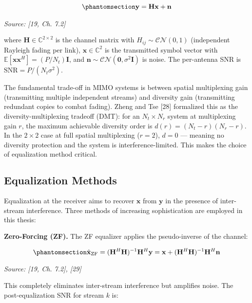 \begin{equation}\protect\phantomsection\label{eq:mimo-received}{\mathbf{y} = \mathbf{H}\mathbf{x} + \mathbf{n}
}\end{equation} \par{\small\textit{Source: [19, Ch. 7.2]}}

where \(\mathbf{H} \in \mathbb{C}^{2 \times 2}\) is the channel matrix with \(H_{ij} \sim \mathcal{CN}(0, 1)\) (independent Rayleigh fading per link), \(\mathbf{x} \in \mathbb{C}^{2}\) is the transmitted symbol vector with \(\mathbb{E}[\mathbf{x}\mathbf{x}^H] = (P/N_t)\mathbf{I}\), and \(\mathbf{n} \sim \mathcal{CN}(\mathbf{0}, \sigma^2\mathbf{I})\) is noise. The per-antenna SNR is \(\text{SNR} = P/(N_t \sigma^2)\).

The fundamental trade-off in MIMO systems is between spatial multiplexing gain (transmitting multiple independent streams) and diversity gain (transmitting redundant copies to combat fading). Zheng and Tse {[}28{]} formalized this as the diversity-multiplexing tradeoff (DMT): for an \(N_t \times N_r\) system at multiplexing gain \(r\), the maximum achievable diversity order is \(d(r) = (N_t - r)(N_r - r)\). In the \(2 \times 2\) case at full spatial multiplexing (\(r = 2\)), \(d = 0\) --- meaning no diversity protection and the system is interference-limited. This makes the choice of equalization method critical.

\subsection{Equalization Methods}\label{sec:equalization-methods}

Equalization at the receiver aims to recover \(\mathbf{x}\) from \(\mathbf{y}\) in the presence of inter-stream interference. Three methods of increasing sophistication are employed in this thesis:

\textbf{Zero-Forcing (ZF).} The ZF equalizer applies the pseudo-inverse of the channel:

\begin{equation}\protect\phantomsection\label{eq:zf-equalizer}{\hat{\mathbf{x}}_{\text{ZF}} = (\mathbf{H}^H\mathbf{H})^{-1}\mathbf{H}^H\mathbf{y} = \mathbf{x} + (\mathbf{H}^H\mathbf{H})^{-1}\mathbf{H}^H\mathbf{n}
}\end{equation} \par{\small\textit{Source: [19, Ch. 7.2], [29]}}

This completely eliminates inter-stream interference but amplifies noise. The post-equalization SNR for stream \(k\) is:


